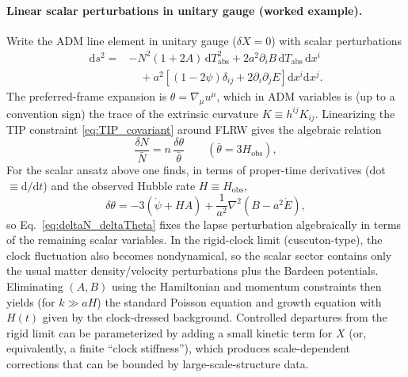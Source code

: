 \documentclass[12pt]{article}
\newcommand{\Tabs}{T_{\mathrm{abs}}}
\newcommand{\Hobs}{H_{\mathrm{obs}}}
\newcommand{\dd}{\mathrm{d}}
\begin{document}
\paragraph{Linear scalar perturbations in unitary gauge (worked example).}
Write the ADM line element in unitary gauge ($\delta X=0$) with scalar perturbations
\begin{equation}
\begin{aligned}
\dd s^{2}={}& -N^{2}(1+2A)\,\dd \Tabs^{2}
+2a^{2}\partial_{i}B\,\dd \Tabs\,\dd x^{i} \\
&\quad +a^{2}\left[(1-2\psi)\delta_{ij}+2\partial_{i}\partial_{j}E\right]\dd x^{i}\dd x^{j}.
\end{aligned}
\end{equation}
The preferred-frame expansion is $\theta=\nabla_{\mu}u^{\mu}$, which in ADM variables is (up to a convention sign) the trace of the extrinsic curvature $K\equiv h^{ij}K_{ij}$. Linearizing the TIP constraint \eqref{eq:TIP_covariant} around FLRW gives the algebraic relation
\begin{equation}
\frac{\delta N}{\bar N}= n\,\frac{\delta\theta}{\bar\theta}
\qquad (\bar\theta=3\Hobs),
\label{eq:deltaN_deltaTheta}
\end{equation}
For the scalar ansatz above one finds, in terms of proper-time derivatives (dot $\equiv\dd/\dd t$) and the observed Hubble rate $H\equiv\Hobs$,
\begin{equation}
\delta\theta = -3(\dot\psi + H A)+\frac{1}{a^{2}}\nabla^{2}\!\left(B-a^{2}\dot E\right),
\label{eq:deltatheta}
\end{equation}
so Eq.~\eqref{eq:deltaN_deltaTheta} fixes the lapse perturbation algebraically in terms of the remaining scalar variables. In the rigid-clock limit (cuscuton-type), the clock fluctuation also becomes nondynamical, so the scalar sector contains only the usual matter density/velocity perturbations plus the Bardeen potentials. Eliminating $(A,B)$ using the Hamiltonian and momentum constraints then yields (for $k\gg aH$) the standard Poisson equation and growth equation with $H(t)$ given by the clock-dressed background. Controlled departures from the rigid limit can be parameterized by adding a small kinetic term for $X$ (or, equivalently, a finite ``clock stiffness''), which produces scale-dependent corrections that can be bounded by large-scale-structure data.
\end{document}
